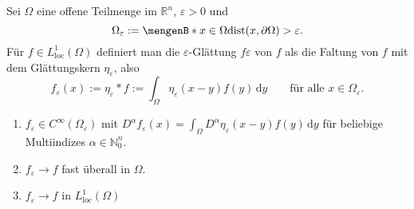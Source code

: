 
\begin{definition*}
	Sei $\Omega$ eine offene Teilmenge im $\mathbb{R}^n$, $\varepsilon >0$ und 
	\[
		\Omega_{\varepsilon} := \set[x \in \Omega]{\dist(x,\partial \Omega)> \varepsilon}.
	\]
	Für $f \in L^1_{\text{loc}}(\Omega)$ definiert man die $\varepsilon$-Glättung $f \varepsilon$ von $f$ als die Faltung von $f$ mit dem Glättungskern $\eta_{\varepsilon}$, also
	\[
		f_{\varepsilon}(x):= \eta_{\varepsilon} * f := \int_{\Omega}^{}\eta_{\varepsilon}(x-y)f(y) \,\mathrm{d}y \qquad \text{für alle }x \in \Omega_{\varepsilon}.
	\]
\end{definition*}

\begin{bemerkung}
	\begin{enumerate}[1)]
		\item $f_{\varepsilon} \in C^{\infty}(\Omega _{\varepsilon})$ mit 
		$D^{\alpha}f _{\varepsilon}(x)= \int_{\Omega}^{}D^{\alpha} \eta_{\varepsilon}(x-y)f(y) \,\mathrm{d}y$ für beliebige Multiindizes $\alpha \in \mathbb{N}_0^n$.
		\item $f_{\varepsilon} \to f$ fast überall in $\Omega$.
		\item $f_{\varepsilon} \to f$ in $L^1_{\text{loc}}(\Omega)$
	\end{enumerate}
\end{bemerkung}

